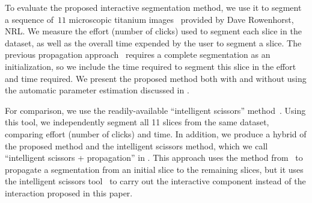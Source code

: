 \documentclass[]{spie}  %
\begin{document}
To evaluate the proposed interactive segmentation method, we use it to
segment a sequence of~$11$ microscopic titanium
images~\cite{rowenhorst:10} provided by Dave Rowenhorst, NRL.  We
measure the effort (\ie number of clicks) used to segment each slice
in the dataset, as well as the overall time expended by the user to
segment a slice.  The previous propagation approach~\cite{waggoner:11}
requires a complete segmentation as an initialization, so we include
the time required to segment this slice in the effort and time
required.  We present the proposed method both with and without using
the automatic parameter estimation discussed in .

For comparison, we use the readily-available ``intelligent scissors''
method~\cite{mortensen:95}.  Using this tool, we independently segment
all 11 slices from the same dataset, comparing effort (number of
clicks) and time.  In addition, we produce a hybrid of the proposed
method and the intelligent scissors method, which we call
``intelligent scissors + propagation'' in .  This approach
uses the method from~\cite{waggoner:11} to propagate a segmentation
from an initial slice to the remaining slices, but it uses the
intelligent scissors tool~\cite{mortensen:95} to carry out the
interactive component instead of the interaction proposed in this
paper.
\end{document}
